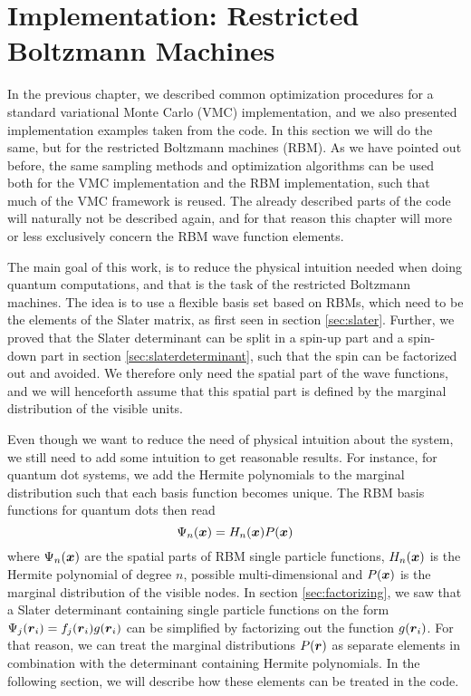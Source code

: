 \chapter{Implementation: Restricted Boltzmann Machines} \label{chp:rbmimplementation}
In the previous chapter, we described common optimization procedures for a standard variational Monte Carlo (VMC) implementation, and we also presented implementation examples taken from the code. In this section we will do the same, but for the restricted Boltzmann machines (RBM). As we have pointed out before, the same sampling methods and optimization algorithms can be used both for the VMC implementation and the RBM implementation, such that much of the VMC framework is reused. The already described parts of the code will naturally not be described again, and for that reason this chapter will more or less exclusively concern the RBM wave function elements.

The main goal of this work, is to reduce the physical intuition needed when doing quantum computations, and that is the task of the restricted Boltzmann machines. The idea is to use a flexible basis set based on RBMs, which need to be the elements of the Slater matrix, as first seen in section \ref{sec:slater}. Further, we proved that the Slater determinant can be split in a spin-up part and a spin-down part in section \ref{sec:slaterdeterminant}, such that the spin can be factorized out and avoided. We therefore only need the spatial part of the wave functions, and we will henceforth assume that this spatial part is defined by the marginal distribution of the visible units. 

Even though we want to reduce the need of physical intuition about the system, we still need to add some intuition to get reasonable results. For instance, for quantum dot systems, we add the Hermite polynomials to the marginal distribution such that each basis function becomes unique. The RBM basis functions for quantum dots then read
\begin{equation}
\Psi_n(\boldsymbol{{x}})=H_n(\boldsymbol{{x}})P(\boldsymbol{{x}})
\end{equation}
where $\Psi_n(\boldsymbol{{x}})$ are the spatial parts of RBM single particle functions, $H_n(\boldsymbol{{x}})$ is the Hermite polynomial of degree $n$, possible multi-dimensional and $P(\boldsymbol{{x}})$ is the marginal distribution of the visible nodes. In section \ref{sec:factorizing}, we saw that a Slater determinant containing single particle functions on the form $\Psi_j(\boldsymbol{{r}}_i)=f_j(\boldsymbol{{r}}_i)g(\boldsymbol{{r}}_i)$ can be simplified by factorizing out the function $g(\boldsymbol{{r}}_i)$. For that reason, we can treat the marginal distributions $P(\boldsymbol{{r}})$ as separate elements in combination with the determinant containing Hermite polynomials. In the following section, we will describe how these elements can be treated in the code. 

